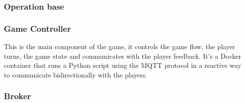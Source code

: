 \documentclass[../main.tex]{subfiles}
\begin{document}
\subsubsection{Operation base}

\subsubsection{Game Controller}

This is the main component of the game, it controls the game flow, the player turns, the game state and communicates with the player feedback. It's a Docker container that runs a Python script using the MQTT protocol in a reactive way to communicate bidirectionally with the players.

\subsubsection{Broker}
\end{document}
